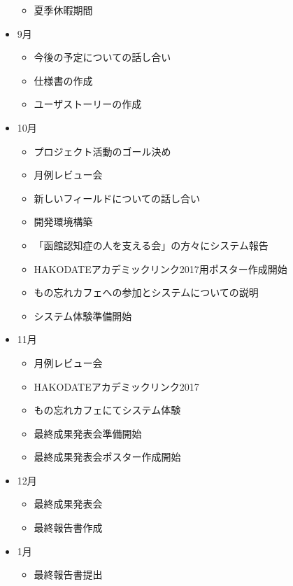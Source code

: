 \documentclass[../report]{subfiles}
\begin{document}
\begin{itemize}
\begin{itemize}
        \item 夏季休暇期間
    \end{itemize}
    \item[] 9月
    \begin{itemize}
        \item 今後の予定についての話し合い
        \item 仕様書の作成
        \item ユーザストーリーの作成
    \end{itemize}
    \item[] 10月
    \begin{itemize}
        \item プロジェクト活動のゴール決め
        \item 月例レビュー会
        \item 新しいフィールドについての話し合い
        \item 開発環境構築
        \item 「函館認知症の人を支える会」の方々にシステム報告
        \item HAKODATEアカデミックリンク2017用ポスター作成開始
        \item もの忘れカフェへの参加とシステムについての説明
        \item システム体験準備開始
    \end{itemize}
    \item[] 11月
    \begin{itemize}
        \item 月例レビュー会
        \item HAKODATEアカデミックリンク2017
        \item もの忘れカフェにてシステム体験
        \item 最終成果発表会準備開始
        \item 最終成果発表会ポスター作成開始
    \end{itemize}
    \item[] 12月
    \begin{itemize}
        \item 最終成果発表会
        \item 最終報告書作成
    \end{itemize}
    \item[] 1月
    \begin{itemize}
        \item 最終報告書提出
    \end{itemize}
\end{itemize}
\end{document}
